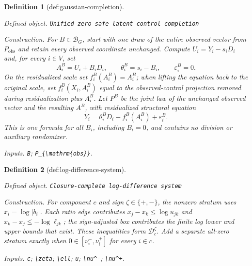 \documentclass{article}
\newtheorem{definition}{Definition}
\begin{document}
\begin{definition}[def:gaussian-completion]\label{def:gaussian-completion}
\par\smallskip\noindent\emph{Defined object.} \texttt{Unified zero-\allowbreak{}safe latent-\allowbreak{}control completion}
\par\smallskip\noindent\emph{Construction.} For \(B\in\mathcal B_G\), start with one draw of the entire observed vector from \(P_{\mathrm{obs}}\) and retain every observed coordinate unchanged.  Compute \(U_i=Y_i-s_iD_i\) and, for every \(i\in V\), set
\[
A_i^B=U_i+B_iD_i,\qquad
\theta_i^B=s_i-B_i,\qquad
\varepsilon_i^B=0.
\]
On the residualized scale set \(f_i^B(A_i^B)=A_i^B\); when lifting the equation back to the original scale, set \(f_i^B(X_i,A_i^B)\) equal to the observed-control projection removed during residualization plus \(A_i^B\).  Let \(P^B\) be the joint law of the unchanged observed vector and the resulting \(A^B\), with residualized structural equation
\[
Y_i=\theta_i^BD_i+f_i^B(A_i^B)+\varepsilon_i^B.
\]
This is one formula for all \(B_i\), including \(B_i=0\), and contains no division or auxiliary randomizer.
\par\smallskip\noindent\emph{Inputs.} \texttt{B}; \texttt{P\_\allowbreak{}\{\textbackslash{}\allowbreak{}mathrm\{obs\}\allowbreak{}\}\allowbreak{}}.
\end{definition}

\begin{definition}[def:log-difference-system]\label{def:log-difference-system}
\par\smallskip\noindent\emph{Defined object.} \texttt{Closure-\allowbreak{}complete log-\allowbreak{}difference system}
\par\smallskip\noindent\emph{Construction.} For component \(c\) and sign \(\zeta\in\{+,-\}\), the nonzero stratum uses \(x_i=\log|b_i|\). Each ratio edge contributes \(x_j-x_k\le\log u_{jk}\) and \(x_k-x_j\le-\log\ell_{jk}\); the sign-adjusted box contributes the finite log lower and upper bounds that exist. These inequalities form \(\mathcal D_c^{\zeta}\). Add a separate all-zero stratum exactly when \(0\in[\nu^-_i,\nu^+_i]\) for every \(i\in c\).
\par\smallskip\noindent\emph{Inputs.} \texttt{c}; \texttt{\textbackslash{}\allowbreak{}zeta}; \texttt{\textbackslash{}\allowbreak{}ell}; \texttt{u}; \texttt{\textbackslash{}\allowbreak{}nu\textasciicircum{}-\allowbreak{}}; \texttt{\textbackslash{}\allowbreak{}nu\textasciicircum{}+\allowbreak{}}.
\end{definition}
\end{document}
